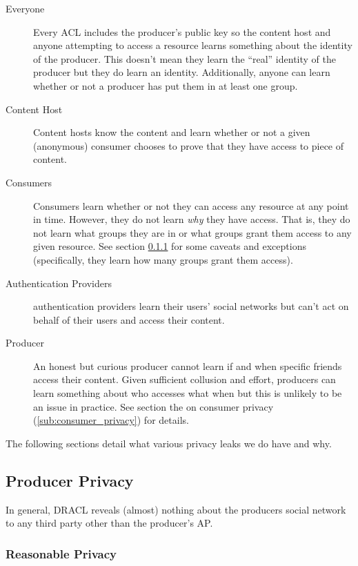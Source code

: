 \documentclass[pdftex,12pt,a4papaer,twoside,notitlepage]{report}
\begin{document}
\begin{description}
\item[Everyone] Every ACL includes the producer's public key so the content host
  and anyone attempting to access a resource learns something about the identity
  of the producer. This doesn't mean they learn the ``real'' identity of the
  producer but they do learn an identity. Additionally, anyone can learn whether
  or not a producer has put them in at least one group.
\item[Content Host] Content hosts know the content and learn whether or not a
  given (anonymous) consumer chooses to prove that they have access to piece of
  content.
\item[Consumers] Consumers learn whether or not they can access any resource at
  any point in time. However, they do not learn \emph{why} they have access.
  That is, they do not learn what groups they are in or what groups grant them
  access to any given resource. See section \ref{sub:resonable_privacy} for
  some caveats and exceptions (specifically, they learn how many groups grant
  them access).
\item[Authentication Providers] authentication providers learn their users'
  social networks but can't act on behalf of their users and access their
  content.
\item[Producer] An honest but curious producer cannot learn if and when specific
  friends access their content. Given sufficient collusion and effort, producers
  can learn something about who accesses what when but this is unlikely to be an
  issue in practice. See section the on consumer privacy
  (\ref{sub:consumer_privacy}) for details.
\end{description}

The following sections detail what various privacy leaks we do have and why.

\subsection{Producer Privacy}
\label{sub:producer_privacy}

In general, DRACL reveals (almost) nothing about the producers social network to
any third party other than the producer's AP.

\subsubsection{Reasonable Privacy}
\label{sub:resonable_privacy}
\end{document}

